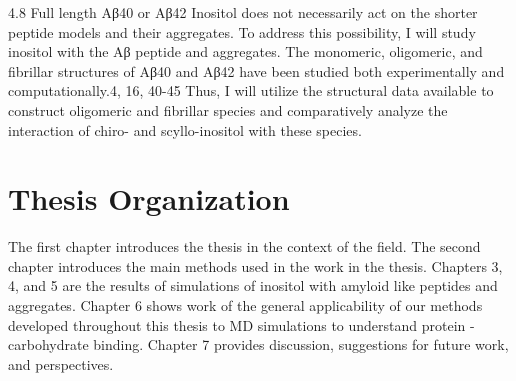 4.8	Full length Aβ40 or Aβ42
	Inositol does not necessarily act on the shorter peptide models and their aggregates. To address this possibility, I will study inositol with the Aβ peptide and aggregates.  The monomeric, oligomeric, and fibrillar structures of Aβ40 and Aβ42 have been studied both experimentally and computationally.4, 16, 40-45  Thus, I will utilize the structural data available to construct oligomeric and fibrillar species and comparatively analyze the interaction of chiro- and scyllo-inositol with these species.

\section{Thesis Organization}

The first chapter introduces the thesis in the context of the field.  The second chapter introduces the main methods used in the work in the thesis. Chapters 3, 4, and 5 are the results of simulations of inositol with amyloid like peptides and aggregates. Chapter 6 shows work of the general applicability of our methods developed throughout this thesis to MD simulations to understand protein - carbohydrate binding. Chapter 7 provides discussion, suggestions for future work, and perspectives.









